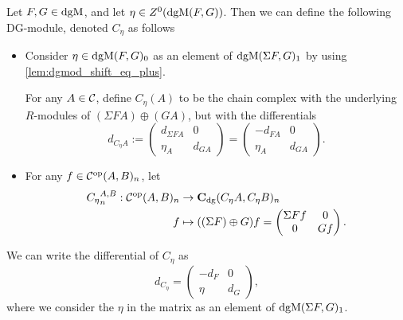 \begin{definition}
    \label{def:dgm_cone}
    Let \( F, G \in \operatorname{dgM} \), and let \( \eta \in Z^0(\operatorname{dgM}(F, G)) \). Then we can define the following DG-module, denoted \( C_{\eta} \) as follows
    \begin{itemize}
        \item {
            Consider \( \eta \in \operatorname{dgM}(F, G)_0 \) as an element of \( \operatorname{dgM}(\Sigma F, G)_1 \) by using \autoref{lem:dgmod_shift_eq_plus}.

            For any \( A \in {\mathcal{C}} \), define \( C_{\eta}(A) \) to be the chain complex with the underlying \( R \)-modules of \( (\Sigma F A) \oplus (G A) \), but with the differentials
            \[
                d_{C_{\eta}A} :=
                \begin{pmatrix}
                    d_{\Sigma F A} & 0 \\
                    \eta_A & d_{GA}
                \end{pmatrix}
                =
                \begin{pmatrix}
                    -d_{F A} & 0 \\
                    \eta_A & d_{GA}
                \end{pmatrix}.
            \]
        }
        \item {
            For any \( f \in {\mathcal{C}}^{\operatorname{op}}(A, B)_n \), let
            \begin{align*}
                {C_{\eta}}_n^{A, B}: {\mathcal{C}}^{\operatorname{op}}(A, B)_n &\to \operatorname{\mathbf{C}}_{\operatorname{dg}}(C_{\eta} A, C_{\eta} B)_n \\
                f &\mapsto ((\Sigma F) \oplus G) f = 
                \begin{pmatrix}
                    \Sigma F f & 0 \\
                    0 & G f
                \end{pmatrix}.
            \end{align*}
        }
    \end{itemize}
\end{definition}

We can write the differential of \( C_{\eta} \) as
\[
    d_{C_{\eta}} =
    \begin{pmatrix}
        -d_F & 0 \\
        \eta & d_G
    \end{pmatrix},
\]
where we consider the \( \eta \) in the matrix as an element of \( \operatorname{dgM}(\Sigma F, G)_1 \).

